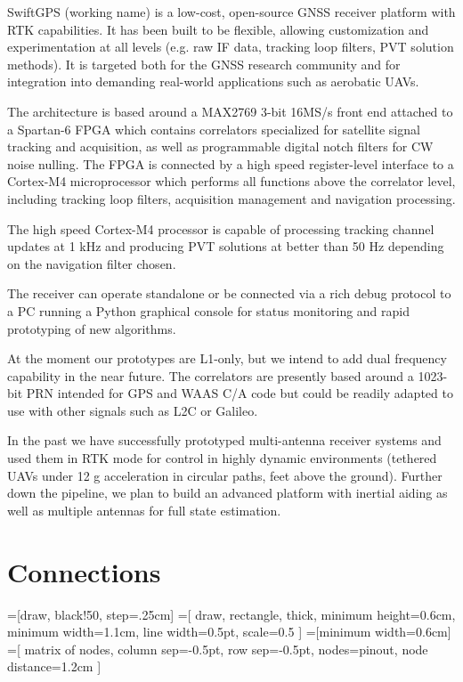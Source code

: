 \documentclass{article}
\begin{document}
\begin{multicols*}{2}
SwiftGPS (working name) is a low-cost, open-source GNSS receiver
platform with RTK capabilities.  It has been built to be flexible,
allowing customization and experimentation at all levels (e.g. raw IF
data, tracking loop filters, PVT solution methods).  It is targeted both for
the GNSS research community and for integration into demanding real-world
applications such as aerobatic UAVs.

The architecture is based around a MAX2769 3-bit 16MS/s front end
attached to a Spartan-6 FPGA which contains correlators specialized
for satellite signal tracking and acquisition, as well as programmable
digital notch filters for CW noise nulling.  The FPGA is connected by
a high speed register-level interface to a Cortex-M4 microprocessor
which performs all functions above the correlator level, including
tracking loop filters, acquisition management and navigation
processing.

The high speed Cortex-M4 processor is capable of processing tracking
channel updates at 1 kHz and producing PVT solutions at better than 50
Hz depending on the navigation filter chosen.

The receiver can operate standalone or be connected via a rich debug
protocol to a PC running a Python graphical console for status
monitoring and rapid prototyping of new algorithms.

At the moment our prototypes are L1-only, but we intend to add dual
frequency capability in the near future.  The correlators are
presently based around a 1023-bit PRN intended for GPS and WAAS C/A
code but could be readily adapted to use with other signals such as
L2C or Galileo.

In the past we have successfully prototyped multi-antenna receiver systems and
used them in RTK mode for control in highly dynamic environments (tethered
UAVs under 12 g acceleration in circular paths, feet above the ground).
Further down the pipeline, we plan to build an advanced platform with
inertial aiding as well as multiple antennas for full state
estimation.

\end{multicols*}

\section*{Connections}
\usetikzlibrary{backgrounds,matrix}
=[draw, black!50, step=.25cm]
=[
  draw, rectangle, thick,
  minimum height=0.6cm,
  minimum width=1.1cm,
  line width=0.5pt,
  scale=0.5
]
=[minimum width=0.6cm]
=[
  matrix of nodes, 
  column sep=-0.5pt,
  row sep=-0.5pt,
  nodes={pinout},
  node distance=1.2cm
]
\end{document}
